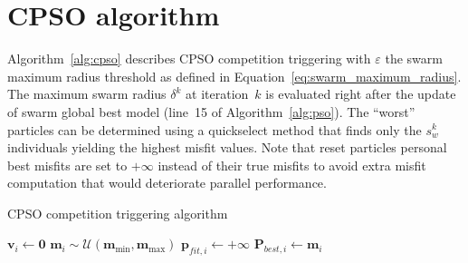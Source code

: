 \section{CPSO algorithm}
\label{app:algo_cpso}

Algorithm~\ref{alg:cpso} describes CPSO competition triggering with $\varepsilon$ the swarm maximum radius threshold as defined in Equation~\ref{eq:swarm_maximum_radius}. The maximum swarm radius $\delta^{k}$ at iteration~$k$ is evaluated right after the update of swarm global best model (line~15 of Algorithm~\ref{alg:pso}). The ``worst'' particles can be determined using a quickselect method that finds only the $s_{w}^{k}$ individuals yielding the highest misfit values. Note that reset particles personal best misfits are set to $+\infty$ instead of their true misfits to avoid extra misfit computation that would deteriorate parallel performance.

\begin{algorithm}[H]
	\centering
	\caption{CPSO competition triggering algorithm}
	\label{alg:cpso}
	\begin{algorithmic}[1]
					\State $\mathbf{v}_{i} \gets \mathbf{0}$ 
					\State $\mathbf{m}_{i} \sim \mathcal{U} \left( \mathbf{m}_{\min}, \mathbf{m}_{\max} \right)$ 
					\State $\mathbf{p}_{fit,i} \gets +\infty$ 
					\State $\mathbf{P}_{best,i} \gets \mathbf{m}_{i}$ 
				\EndIf
			\EndFor
		\EndIf
	\end{algorithmic}
\end{algorithm}